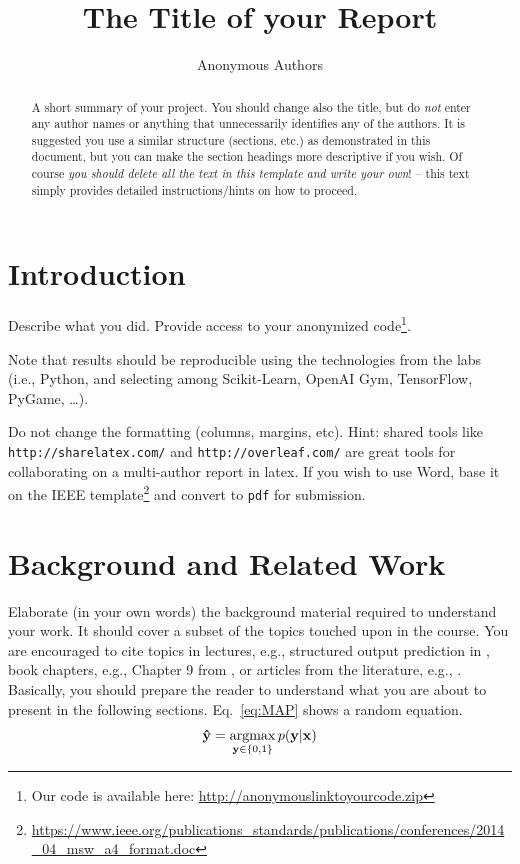 \documentclass[journal, a4paper]{IEEEtran}
\newcommand{\argmax}{\operatornamewithlimits{argmax}}
\newcommand{\x}{\mathbf{x}}
\newcommand{\y}{\mathbf{y}}
\newcommand{\ypred}{\mathbf{\hat y}}
\theoremstyle{plain}
\theoremstyle{definition}
\begin{document}
\title{The Title of your Report}
\author{Anonymous Authors}
\maketitle

\begin{abstract}
	A short summary of your project. You should change also the title, but do \emph{not} enter any author names or anything that unnecessarily identifies any of the authors. It is suggested you use a similar structure (sections, etc.) as demonstrated in this document, but you can make the section headings more descriptive if you wish. Of course \emph{you should delete all the text in this template and write your own}! -- this text simply provides detailed instructions/hints on how to proceed.

\end{abstract}

\section{Introduction}

Describe what you did. Provide access to your anonymized code\footnote{Our code is available here: \url{http://anonymouslinktoyourcode.zip}}.

Note that results should be reproducible using the technologies from the labs (i.e., Python, and selecting among Scikit-Learn, OpenAI Gym, TensorFlow, PyGame, \ldots).

Do not change the formatting (columns, margins, etc). Hint: shared tools like \texttt{http://sharelatex.com/} and \texttt{http://overleaf.com/} are great tools for collaborating on a multi-author report in latex. If you wish to use Word, base it on the IEEE template\footnote{\url{https://www.ieee.org/publications_standards/publications/conferences/2014_04_msw_a4_format.doc}} and convert to \texttt{pdf} for submission. 

\section{Background and Related Work}

Elaborate (in your own words) the background material required to understand your work. It should cover a subset of the topics touched upon in the course. You are encouraged to cite topics in lectures, e.g., structured output prediction in \cite{LectureSOP}, book chapters, e.g., Chapter 9 from \cite{Barber}, or articles from the literature, e.g., \cite{Astar,DeepMindSC2}. Basically, you should prepare the reader to understand what you are about to present in the following sections. Eq.~\eqref{eq:MAP} shows a random equation.
\begin{equation}
	\label{eq:MAP}
	\ypred = \argmax_{\y \in \{0,1\}} p(\y|\x)
\end{equation}
\end{document}
